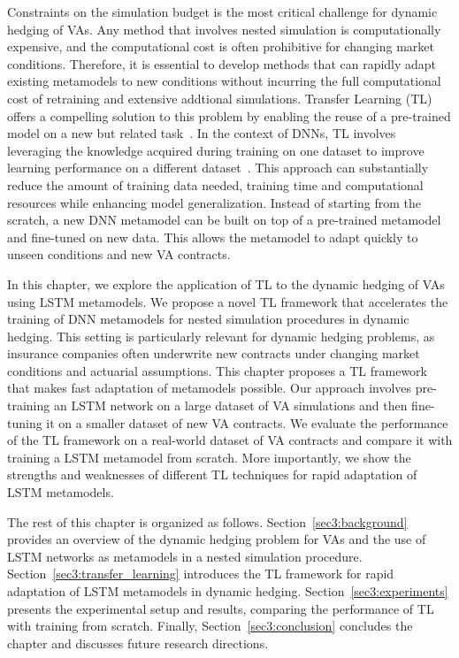 Constraints on the simulation budget is the most critical challenge for dynamic hedging of VAs.
Any method that involves nested simulation is computationally expensive, and the computational cost is often prohibitive for changing market conditions.
Therefore, it is essential to develop methods that can rapidly adapt existing metamodels to new conditions without incurring the full computational cost of retraining and extensive addtional simulations.
Transfer Learning (TL) offers a compelling solution to this problem by enabling the reuse of a pre-trained model on a new but related task~\citep{pan2009survey}.
In the context of DNNs, TL involves leveraging the knowledge acquired during training on one dataset to improve learning performance on a different dataset~\citep{yosinski2014transferable}.
This approach can substantially reduce the amount of training data needed, training time and computational resources while enhancing model generalization.
Instead of starting from the scratch, a new DNN metamodel can be built on top of a pre-trained metamodel and fine-tuned on new data.
This allows the metamodel to adapt quickly to unseen conditions and new VA contracts.

In this chapter, we explore the application of TL to the dynamic hedging of VAs using LSTM metamodels.
We propose a novel TL framework that accelerates the training of DNN metamodels for nested simulation procedures in dynamic hedging.
This setting is particularly relevant for dynamic hedging problems, as insurance companies often underwrite new contracts under changing market conditions and actuarial assumptions.
This chapter proposes a TL framework that makes fast adaptation of metamodels possible.
Our approach involves pre-training an LSTM network on a large dataset of VA simulations and then fine-tuning it on a smaller dataset of new VA contracts.
We evaluate the performance of the TL framework on a real-world dataset of VA contracts and compare it with training a LSTM metamodel from scratch.
More importantly, we show the strengths and weaknesses of different TL techniques for rapid adaptation of LSTM metamodels.

The rest of this chapter is organized as follows.
Section~\ref{sec3:background} provides an overview of the dynamic hedging problem for VAs and the use of LSTM networks as metamodels in a nested simulation procedure.
Section~\ref{sec3:transfer_learning} introduces the TL framework for rapid adaptation of LSTM metamodels in dynamic hedging.
Section~\ref{sec3:experiments} presents the experimental setup and results, comparing the performance of TL with training from scratch.
Finally, Section~\ref{sec3:conclusion} concludes the chapter and discusses future research directions.

